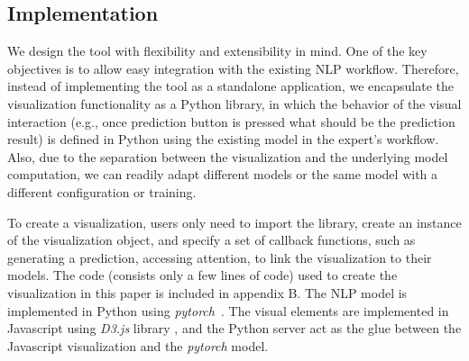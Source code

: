 \subsection{Implementation}
\label{sec:implementation}
We design the tool with flexibility and extensibility in mind. One of the key objectives is to allow easy integration with the existing NLP workflow. Therefore, instead of implementing the tool as a standalone application, we encapsulate the visualization functionality as a Python library, in which the behavior of the visual interaction (e.g., once prediction button is pressed what should be the prediction result) is defined in Python using the existing model in the expert's workflow. Also, due to the separation between the visualization and the underlying model computation, we can readily adapt different models or the same model with a different configuration or training. 

To create a visualization, users only need to import the library, create an instance of the visualization object, and specify a set of callback functions, such as generating a prediction, accessing attention, to link the visualization to their models. The code (consists only a few lines of code) used to create the visualization in this paper is included in appendix B.
%
The NLP model is implemented in Python using \emph{pytorch}~\cite{PaszkeGrossChintala2017}.
The visual elements are implemented in Javascript using \emph{D3.js} library , and the Python server act as the glue between the Javascript visualization and the \emph{pytorch} model.
